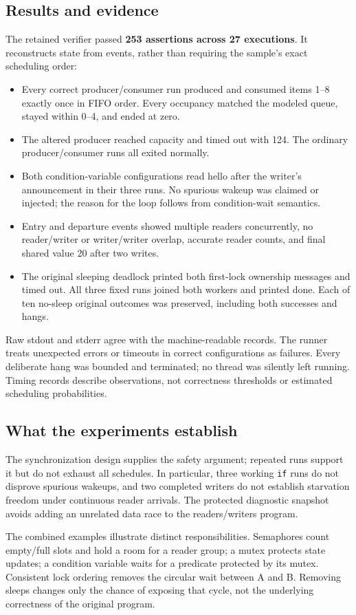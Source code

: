 \documentclass[12pt]{article}
\begin{document}
\subsection{Results and evidence}
The retained verifier passed \textbf{253 assertions across 27 executions}.
It reconstructs state from events, rather than requiring the sample's
exact scheduling order:
\begin{itemize}
\item Every correct producer/consumer run produced and consumed items
1--8 exactly once in FIFO order. Every occupancy matched the modeled queue,
stayed within 0--4, and ended at zero.
\item The altered producer reached capacity and timed out with 124. The
ordinary producer/consumer runs all exited normally.
\item Both condition-variable configurations read hello after the writer's
announcement in their three runs. No spurious wakeup was claimed or
injected; the reason for the loop follows from condition-wait semantics.
\item Entry and departure events showed multiple readers concurrently,
no reader/writer or writer/writer overlap, accurate reader counts, and
final shared value 20 after two writes.
\item The original sleeping deadlock printed both first-lock ownership
messages and timed out. All three fixed runs joined both workers and
printed done. Each of ten no-sleep original outcomes was preserved,
including both successes and hangs.
\end{itemize}
Raw stdout and stderr agree with the machine-readable records. The
runner treats unexpected errors or timeouts in correct configurations
as failures. Every deliberate hang was bounded and terminated; no thread
was silently left running. Timing records describe observations, not
correctness thresholds or estimated scheduling probabilities.

\subsection{What the experiments establish}
The synchronization design supplies the safety argument; repeated runs
support it but do not exhaust all schedules. In particular, three working
\texttt{if} runs do not disprove spurious wakeups, and two completed writers
do not establish starvation freedom under continuous reader arrivals.
The protected diagnostic snapshot avoids adding an unrelated data race to
the readers/writers program.

The combined examples illustrate distinct responsibilities. Semaphores
count empty/full slots and hold a room for a reader group; a mutex protects
state updates; a condition variable waits for a predicate protected by its
mutex. Consistent lock ordering removes the circular wait between A and B.
Removing sleeps changes only the chance of exposing that cycle, not the
underlying correctness of the original program.
\end{document}
